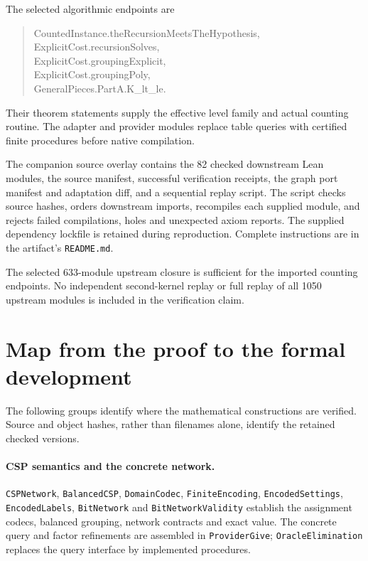 \documentclass[11pt,reqno]{amsart}
\numberwithin{equation}{section}
\theoremstyle{definition}
\theoremstyle{remark}
\begin{document}
The selected algorithmic endpoints are
\begin{quote}\small\ttfamily
CountedInstance.theRecursionMeetsTheHypothesis,\\
ExplicitCost.recursionSolves,\\
ExplicitCost.groupingExplicit,\\
ExplicitCost.groupingPoly,\\
GeneralPieces.PartA.K\_lt\_le.
\end{quote}
Their theorem statements supply the effective level family and actual counting routine. The adapter and provider modules replace table queries with certified finite procedures before native compilation.

The companion source overlay contains the 82 checked downstream Lean modules, the source manifest, successful verification receipts, the graph port manifest and adaptation diff, and a sequential replay script. The script checks source hashes, orders downstream imports, recompiles each supplied module, and rejects failed compilations, holes and unexpected axiom reports. The supplied dependency lockfile is retained during reproduction. Complete instructions are in the artifact's \texttt{README.md}.

The selected 633-module upstream closure is sufficient for the imported counting endpoints. No independent second-kernel replay or full replay of all 1050 upstream modules is included in the verification claim.

\section{Map from the proof to the formal development}

The following groups identify where the mathematical constructions are verified. Source and object hashes, rather than filenames alone, identify the retained checked versions.

\begingroup\raggedright\small
\paragraph{CSP semantics and the concrete network.}
\texttt{CSPNetwork}, \texttt{BalancedCSP}, \texttt{DomainCodec}, \texttt{FiniteEncoding}, \texttt{EncodedSettings}, \texttt{EncodedLabels}, \texttt{BitNetwork} and \texttt{BitNetworkValidity} establish the assignment codecs, balanced grouping, network contracts and exact value. The concrete query and factor refinements are assembled in \texttt{ProviderGive}; \texttt{OracleElimination} replaces the query interface by implemented procedures.
\end{document}
